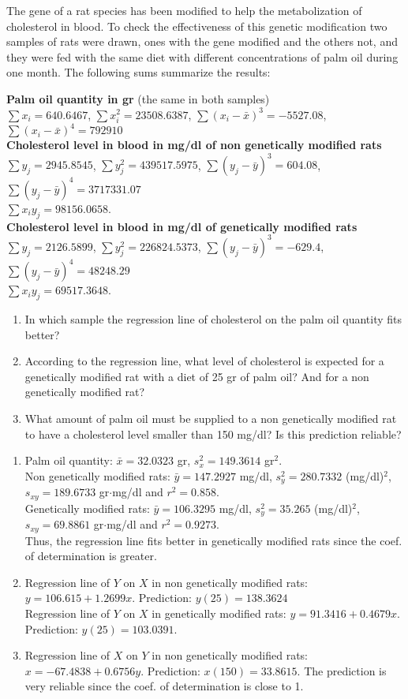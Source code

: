 {The gene of a rat species has been modified to help the metabolization of cholesterol in blood.
To check the effectiveness of this genetic modification two samples of rats were drawn, ones with the gene modified and the others not, and they were fed with the same diet with different concentrations of palm oil during one month. 
The following sums summarize the results:

\textbf{Palm oil quantity in gr} (the same in both samples)\\
\(\sum x_i=640.6467\), \(\sum x_i^2=23508.6387\),
\(\sum(x_i-\bar x)^3=-5527.08\), \(\sum(x_i-\bar x)^4=792910\)\\
\textbf{Cholesterol level in blood in mg/dl of non genetically modified rats}\\
\(\sum y_j=2945.8545\), \(\sum y_j^2=439517.5975\),
\(\sum(y_j-\bar y)^3=604.08\), \(\sum(y_j-\bar y)^4=3717331.07\)\\
\(\sum x_iy_j=98156.0658\).\\
\textbf{Cholesterol level in blood in mg/dl of genetically modified rats}\\
\(\sum y_j=2126.5899\), \(\sum y_j^2=226824.5373\),
\(\sum(y_j-\bar y)^3=-629.4\), \(\sum(y_j-\bar y)^4=48248.29\)\\
\(\sum x_iy_j=69517.3648\).

\begin{enumerate}
\item In which sample the regression line of cholesterol on the palm oil quantity fits better?
\item According to the regression line, what level of cholesterol is expected for a genetically modified rat with a diet of 25 gr of palm oil?
And for a non genetically modified rat?
\item What amount of palm oil must be supplied to a non genetically modified rat to have a cholesterol level smaller than 150 mg/dl?
Is this prediction reliable?
\end{enumerate}
}
{\begin{enumerate}
\item Palm oil quantity: $\bar x=32.0323$ gr,  $s^2_x=149.3614$ gr$^2$.\\
Non genetically modified rats: $\bar y=147.2927$ mg/dl,  $s^2_y=280.7332$ (mg/dl)$^2$, $s_{xy}=189.6733$ gr$\cdot$mg/dl and $r^2=0.858$.\\
Genetically modified rats: $\bar y=106.3295$ mg/dl,  $s^2_y=35.265$ (mg/dl)$^2$, $s_{xy}=69.8861$ gr$\cdot$mg/dl and $r^2=0.9273$.\\
Thus, the regression line fits better in genetically modified rats since the coef. of determination is greater.
\item Regression line of $Y$ on $X$ in non genetically modified rats: $y=106.615+1.2699x$. Prediction: $y(25)=138.3624$\\
Regression line of $Y$ on $X$ in genetically modified rats: $y=91.3416+0.4679x$. Prediction: $y(25)=103.0391$.
\item Regression line of $X$ on $Y$ in non genetically modified rats: $x=-67.4838+0.6756y$. Prediction: $x(150)=33.8615$. The prediction is very reliable since the coef. of determination is close to 1.
\end{enumerate}
}
{
}